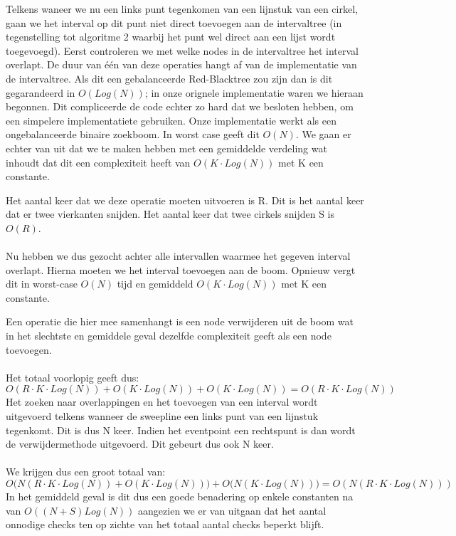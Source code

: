 \documentclass[11pt,a4paper]{article}
\begin{document}
Telkens waneer we nu een links punt tegenkomen van een lijnstuk van een cirkel, gaan we het interval op dit punt niet direct toevoegen aan de intervaltree (in tegenstelling tot algoritme 2 waarbij het punt wel direct aan een lijst wordt toegevoegd). Eerst controleren we met welke nodes in de intervaltree het interval overlapt. De duur van \'e\'en van deze operaties hangt af van de implementatie van de intervaltree. Als dit een gebalanceerde Red-Blacktree zou zijn dan is dit gegarandeerd in $O(Log(N))$; in onze orignele implementatie waren we hieraan begonnen. Dit compliceerde de code echter zo hard dat we besloten hebben, om een simpelere implementatiete gebruiken. Onze implementatie werkt als een ongebalanceerde binaire zoekboom. In worst case geeft dit $O(N)$. We gaan er echter van uit dat we te maken hebben met een gemiddelde verdeling wat inhoudt dat dit een complexiteit heeft van $O(K\cdot Log(N))$ met K een constante.


Het aantal keer dat we deze operatie moeten uitvoeren is R. Dit is het aantal keer dat er twee vierkanten snijden. Het aantal keer dat twee cirkels snijden S is $O(R)$. 
\\
\\
Nu hebben we dus gezocht achter alle intervallen waarmee het gegeven interval overlapt. Hierna moeten we het interval toevoegen aan de boom. Opnieuw vergt dit in worst-case $O(N)$ tijd en gemiddeld $O(K\cdot Log(N))$ met K een constante.


Een operatie die hier mee samenhangt is een node verwijderen uit de boom wat in het slechtste en gemiddele geval dezelfde complexiteit geeft als een node toevoegen.
\\
\\
Het totaal voorlopig geeft dus:
$$O(R\cdot K \cdot Log(N)) + O(K\cdot Log(N)) + O(K\cdot Log(N)) = O(R\cdot K \cdot Log(N))$$ 
Het zoeken naar overlappingen en het toevoegen van een interval wordt uitgevoerd telkens wanneer de sweepline een links punt van een lijnstuk tegenkomt. Dit is dus N keer.
Indien het eventpoint een rechtspunt is dan wordt de verwijdermethode uitgevoerd. Dit gebeurt dus ook N keer.
\\
\\
We krijgen dus een groot totaal van:
$$O\Big( N(R\cdot K \cdot Log(N)) + O(K\cdot Log(N)) \Big) + O\Big(N(K\cdot Log(N))\Big) = O(N(R\cdot K \cdot Log(N)))$$ 
In het gemiddeld geval is dit dus een goede benadering op enkele constanten na van $O((N+S)Log(N))$ aangezien we er van uitgaan dat het aantal onnodige checks ten op zichte van het totaal aantal checks beperkt blijft.
\end{document}
